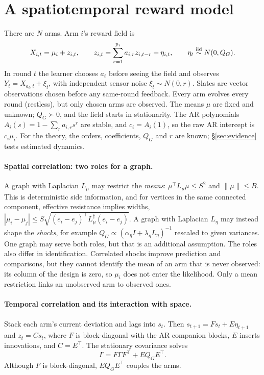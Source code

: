\documentclass[sigconf,review,anonymous]{acmart}
\begin{document}
\section{A spatiotemporal reward model}\label{sec:model}

There are $N$ arms. Arm $i$'s reward field is
\begin{equation}\label{eq:model}
X_{i,t}=\mu_i+z_{i,t},\qquad z_{i,t}=\sum_{r=1}^{p_i}a_{i,r}z_{i,t-r}+\eta_{i,t},\qquad \eta_t\stackrel{\rm iid}{\sim}N(0,Q_G).
\end{equation}
In round $t$ the learner chooses $a_t$ before seeing the field and observes $Y_t=X_{a_t,t}+\xi_t$, with independent sensor noise $\xi_t\sim N(0,r)$. Slates are vector observations chosen before any same-round feedback. Every arm evolves every round (restless), but only chosen arms are observed. The means $\mu$ are fixed and unknown; $Q_G\succ0$, and the field starts in stationarity. The AR polynomials $A_i(s)=1-\sum_ra_{i,r}s^r$ are stable, and $c_i=A_i(1)$, so the raw AR intercept is $c_i\mu_i$. For the theory, the orders, coefficients, $Q_G$ and $r$ are known; \S\ref{sec:evidence} tests estimated dynamics.

\paragraph{Spatial correlation: two roles for a graph.} A graph with Laplacian $L_\mu$ may restrict the \emph{means}: $\mu^\top L_\mu\mu\le S^2$ and $\|\mu\|\le B$. This is deterministic side information, and for vertices in the same connected component, effective resistance implies widths, $|\mu_i-\mu_j|\le S\sqrt{(e_i-e_j)^\top L_\mu^\dagger(e_i-e_j)}$. A graph with Laplacian $L_\eta$ may instead shape the \emph{shocks}, for example $Q_G\propto(\alpha_\eta I+\lambda_\eta L_\eta)^{-1}$ rescaled to given variances. One graph may serve both roles, but that is an additional assumption. The roles also differ in identification. Correlated shocks improve prediction and comparisons, but they cannot identify the mean of an arm that is never observed: its column of the design is zero, so $\mu_i$ does not enter the likelihood. Only a mean restriction links an unobserved arm to observed ones.

\paragraph{Temporal correlation and its interaction with space.} Stack each arm's current deviation and lags into $s_t$. Then $s_{t+1}=Fs_t+E\eta_{t+1}$ and $z_t=Cs_t$, where $F$ is block-diagonal with the AR companion blocks, $E$ inserts innovations, and $C=E^\top$. The stationary covariance solves
\[\Gamma=F\Gamma F^\top+EQ_GE^\top.\] Although $F$ is block-diagonal, $EQ_GE^\top$ couples the arms.
\end{document}
